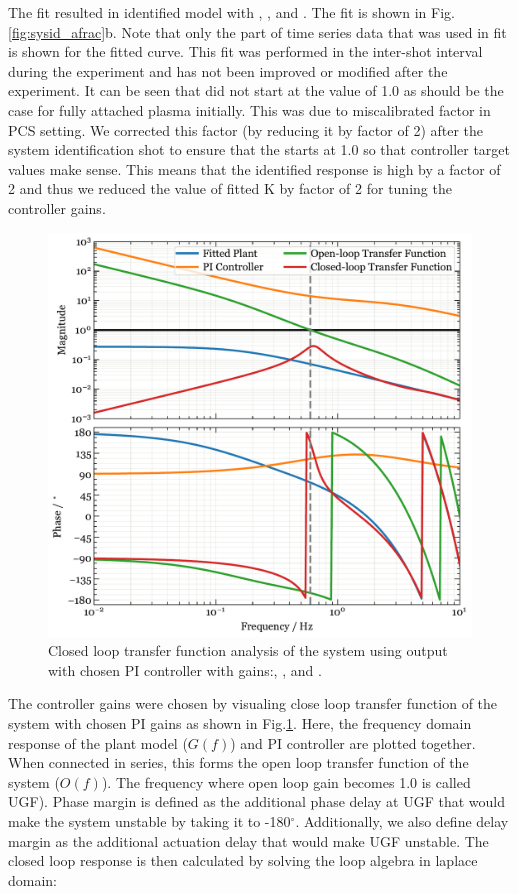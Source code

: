The fit resulted in identified model with \AfracK, \AfracTau, and \AfracL. The fit is shown in Fig.\ref{fig:sysid_afrac}b. Note that only the part of time series data that was used in fit is shown for the fitted curve. This fit was performed in the inter-shot interval during the experiment and has not been improved or modified after the experiment. It can be seen that \Afrac did not start at the value of 1.0 as should be the case for fully attached plasma initially. This was due to miscalibrated factor in PCS setting. We corrected this factor (by reducing it by factor of 2) after the system identification shot to ensure that the \Afrac starts at 1.0 so that controller target values make sense. This means that the identified response is high by a factor of 2 and thus we reduced the value of fitted K by factor of 2 for tuning the controller gains.



\begin{figure}[!ht]
 \centering
 \includegraphics[width=\linewidth]{figures/Afrac_LoopStability.pdf}
 \caption{Closed loop transfer function analysis of the system  using \Afrac output with chosen PI controller with gains:\AfracKp, \AfracTi, and \Afracstau.}
 \label{fig:cltf_afrac}
\end{figure}


The controller gains were chosen by visualing close loop transfer function of the system with chosen PI gains as shown in Fig.\ref{fig:cltf_afrac}. Here, the frequency domain response of the plant model ($G(f)$) and PI controller are plotted together. When connected in series, this forms the open loop transfer function of the system ($O(f)$). The frequency where open loop gain becomes 1.0 is called \ac{UGF}). Phase margin is defined as the additional phase delay at \ac{UGF} that would make the system unstable by taking it to -180$^\circ$. Additionally, we also define delay margin as the additional actuation delay that would make \ac{UGF} unstable. The closed loop response is then calculated by solving the loop algebra in laplace domain:

